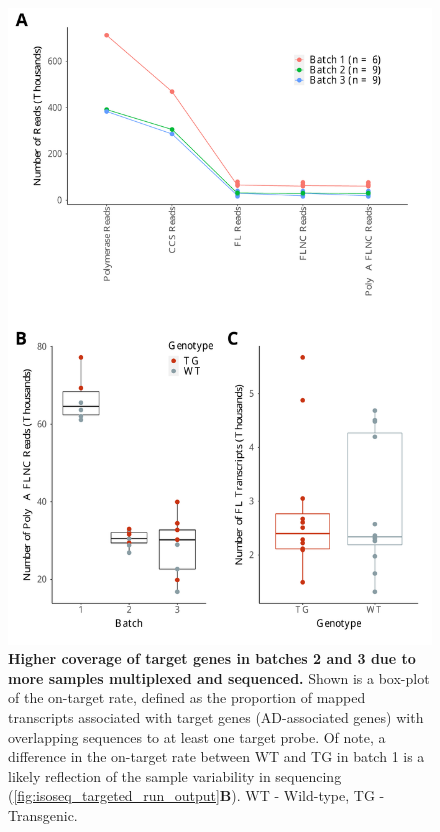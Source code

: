 \begin{figure}[!htp]
	\centering
		\includegraphics[page=2,trim={0 25cm 0 0},clip,scale = 0.55]{Figures/TargetedTranscriptome.pdf}
	\captionsetup{width=0.95\textwidth}
	\caption[On-target rate of Iso-Seq targeted profiling]%
	{\textbf{Higher coverage of target genes in batches 2 and 3 due to more samples multiplexed and sequenced.} Shown is a box-plot of the on-target rate, defined as the proportion of mapped transcripts associated with target genes (AD-associated genes) with overlapping sequences to at least one target probe. Of note, a difference in the on-target rate between WT and TG in batch 1 is a likely reflection of the sample variability in sequencing (\cref{fig:isoseq_targeted_run_output}\textbf{B}). WT - Wild-type, TG - Transgenic.}
	\label{fig:isoseq_targeted_rate}
\end{figure}

